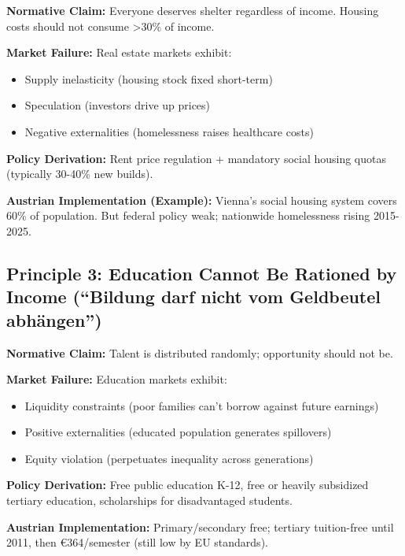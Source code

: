 \begin{tcolorbox}[colback=gray!5!white, colframe=gray!75!black,
    title=Principle GEN-2: Housing as Right]

\textbf{Normative Claim:} Everyone deserves shelter regardless of income. Housing costs should not consume >30\% of income.

\textbf{Market Failure:} Real estate markets exhibit:
\begin{itemize}[nosep]
\item Supply inelasticity (housing stock fixed short-term)
\item Speculation (investors drive up prices)
\item Negative externalities (homelessness raises healthcare costs)
\end{itemize}

\textbf{Policy Derivation:} Rent price regulation + mandatory social housing quotas (typically 30-40\% new builds).

\textbf{Austrian Implementation (Example):} Vienna's social housing system covers 60\% of population. But federal policy weak; nationwide homelessness rising 2015-2025.

\end{tcolorbox}


\subsection{Principle 3: Education Cannot Be Rationed by Income (``Bildung darf nicht vom Geldbeutel abhängen'')}

\begin{tcolorbox}[colback=gray!5!white, colframe=gray!75!black,
    title=Principle GEN-3: Education Universality]

\textbf{Normative Claim:} Talent is distributed randomly; opportunity should not be.

\textbf{Market Failure:} Education markets exhibit:
\begin{itemize}[nosep]
\item Liquidity constraints (poor families can't borrow against future earnings)
\item Positive externalities (educated population generates spillovers)
\item Equity violation (perpetuates inequality across generations)
\end{itemize}

\textbf{Policy Derivation:} Free public education K-12, free or heavily subsidized tertiary education, scholarships for disadvantaged students.

\textbf{Austrian Implementation:} Primary/secondary free; tertiary tuition-free until 2011, then €364/semester (still low by EU standards).

\end{tcolorbox}

